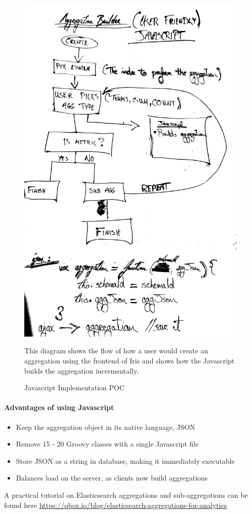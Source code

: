 \documentclass[12pt,a4paper,titlepage]{report}
\begin{document}
\begin{figure}[H]
\begin{tcolorbox}
\centerline{\includegraphics[width=\textwidth]{js_agg_builder_flow_1}}

This diagram shows the flow of how a user would create an aggregation using the frontend of Iris and shows how the Javascript builds the aggregation incrementally.
\end{tcolorbox}
\caption{Javascript Implementation POC}
\end{figure}

\paragraph{Advantages of using Javascript}
\begin{itemize}
\item Keep the aggregation object in its native language, JSON
\item Remove 15 - 20 Groovy classes with a single Javascript file
\item Store JSON as a string in database, making it immediately executable
\item Balances load on the server, as clients now build aggregations
\end{itemize}
A practical tutorial on Elasticsearch aggregations and sub-aggregations can be found here \url{https://qbox.io/blog/elasticsearch-aggregations-for-analytics}
\end{document}
